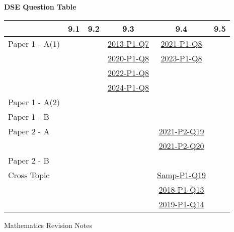 \documentclass[12pt, a4paper]{article}
\begin{document}
\begin{absolutelynopagebreak}
\begin{center}
\textbf{DSE Question Table}
\end{center}
\begin{center}
\begin{tabular}{|l|c|c|c|c|c|}
\hline
        & 9.1 & 9.2 & 9.3 & 9.4 & 9.5 \\\hline
\hline
Paper 1 - A(1)&  &  & \hyperref[DSE2013-CoreP1-Q07]{2013-P1-Q7} & \hyperref[DSE2021-CoreP1-Q08]{2021-P1-Q8} &  \\
&  &  & \hyperref[DSE2020-CoreP1-Q08]{2020-P1-Q8} & \hyperref[DSE2023-CoreP1-Q08]{2023-P1-Q8} &  \\
&  &  & \hyperref[DSE2022-CoreP1-Q08]{2022-P1-Q8} &  &  \\
&  &  & \hyperref[DSE2024-CoreP1-Q08]{2024-P1-Q8} &  &  \\
\hline
Paper 1 - A(2)&  &  &  &  &  \\
\hline
Paper 1 - B&  &  &  &  &  \\
\hline
\hline
Paper 2 - A&  &  &  & \hyperref[DSE2021-CoreP2-Q19]{2021-P2-Q19} &  \\
&  &  &  & \hyperref[DSE2021-CoreP2-Q20]{2021-P2-Q20} &  \\
\hline
Paper 2 - B&  &  &  &  &  \\
\hline
\hline
Cross Topic&  &  &  & \hyperref[DSE2012S-CoreP1-Q19]{Samp-P1-Q19} &  \\
&  &  &  & \hyperref[DSE2018-CoreP1-Q13]{2018-P1-Q13} &  \\
&  &  &  & \hyperref[DSE2019-CoreP1-Q14]{2019-P1-Q14} &  \\
\hline
\end{tabular}
\end{center}
\end{absolutelynopagebreak}
\newpage
\newpage
\thispagestyle{empty}
\begin{center}
Mathematics Revision Notes\\\vspace{1cm}
\\\vspace{1cm}
{\fontsize{24pt}{24pt}\selectfont {Pythagoras' Theorem and Irrational Numbers}} \\\vspace{1cm}
\label{chapter:S2-10}

\end{center}
\vspace{0.5cm}
\hline
\end{document}
